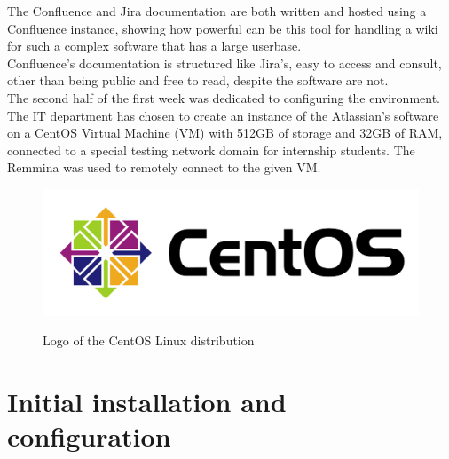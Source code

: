 	The Confluence and Jira documentation are both written and hosted using a Confluence instance, showing how powerful can be this tool for handling a wiki for such a complex software that has a large userbase.\\
	Confluence's documentation is structured like Jira's, easy to access and consult, other than being public and free to read, despite the software are not.\\
	The second half of the first week was dedicated to configuring the environment.
	The IT department has chosen to create an instance of the Atlassian's software on a \gls{CentOS} \gls{Virtual Machine} (VM) with 512GB of storage and 32GB of RAM, connected to a special testing network domain for internship students.
	The \gls{Remmina} was used to remotely connect to the given VM.
	\begin{figure}[H]
		\centering
		\includegraphics[width=.5\textwidth]{resources/centos_logo}\\
		\caption{Logo of the CentOS Linux distribution}
	\end{figure}
	
\section{Initial installation and configuration}	


